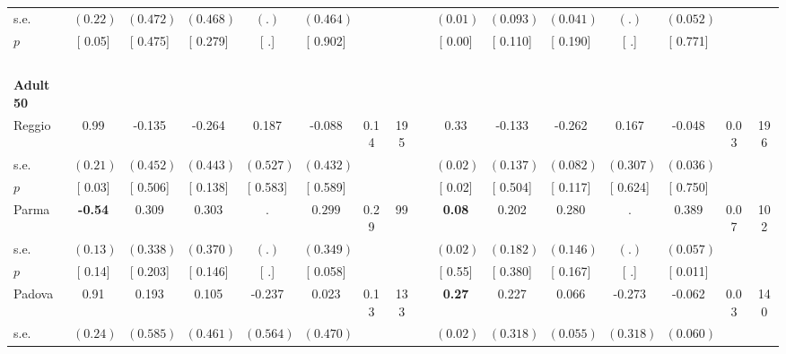 \begin{longtable}{L{8em} c c c c c c c p{1em} c c c c c c c}
\quad \quad \quad \quad s.e.& $ (     0.22)$ & $ (    0.472)$ & $ (    0.468)$ & $ (        .)$ & $ (    0.464)$ & & & & $ (     0.01)$ & $ (    0.093)$ & $ (    0.041)$ & $ (        .)$ & $ (    0.052)$ & &  \\*
\quad \quad \quad \quad $ p$ & [     0.05] & [    0.475] & [    0.279] & [        .] & [    0.902] & & & & [     0.00] & [    0.110] & [    0.190] & [        .] & [    0.771] & &  \\[1em]
~\\[1em]
\quad \quad \textbf{Adult 50} & & & & & & & & & & & & & & & \\* 
\quad \quad \quad Reggio& 0.99 &    -0.135 &    -0.264 &     0.187 &    -0.088 &      0.14 &       195 & & 0.33 &    -0.133 &    -0.262 &     0.167 &    -0.048 &      0.03 &       196  \\*
\quad \quad \quad \quad s.e.& $ (     0.21)$ & $ (    0.452)$ & $ (    0.443)$ & $ (    0.527)$ & $ (    0.432)$ & & & & $ (     0.02)$ & $ (    0.137)$ & $ (    0.082)$ & $ (    0.307)$ & $ (    0.036)$ & &  \\*
\quad \quad \quad \quad $ p$ & [     0.03] & [    0.506] & [    0.138] & [    0.583] & [    0.589] & & & & [     0.02] & [    0.504] & [    0.117] & [    0.624] & [    0.750] & &  \\[1em]
\quad \quad \quad Parma& \textbf{    -0.54} &     0.309 &     0.303 &         . & $ \mathbf{    0.299}$ &      0.29 &        99 & & \textbf{     0.08} &     0.202 &     0.280 &         . & $ \mathbf{    0.389}$ &      0.07 &       102  \\*
\quad \quad \quad \quad s.e.& $ (     0.13)$ & $ (    0.338)$ & $ (    0.370)$ & $ (        .)$ & $ (    0.349)$ & & & & $ (     0.02)$ & $ (    0.182)$ & $ (    0.146)$ & $ (        .)$ & $ (    0.057)$ & &  \\*
\quad \quad \quad \quad $ p$ & [     0.14] & [    0.203] & [    0.146] & [        .] & [    0.058] & & & & [     0.55] & [    0.380] & [    0.167] & [        .] & [    0.011] & &  \\[1em]
\quad \quad \quad Padova& 0.91 &     0.193 &     0.105 &    -0.237 &     0.023 &      0.13 &       133 & & \textbf{     0.27} &     0.227 &     0.066 &    -0.273 &    -0.062 &      0.03 &       140  \\*
\quad \quad \quad \quad s.e.& $ (     0.24)$ & $ (    0.585)$ & $ (    0.461)$ & $ (    0.564)$ & $ (    0.470)$ & & & & $ (     0.02)$ & $ (    0.318)$ & $ (    0.055)$ & $ (    0.318)$ & $ (    0.060)$ & &  \\*

\end{longtable}
